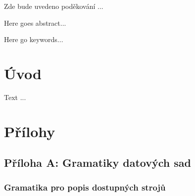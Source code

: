 \documentclass[draft]{fithesis}
\begin{document}
\FrontMatter
\ThesisTitlePage

\begin{ThesisDeclaration}
\DeclarationText
\AdvisorName
\end{ThesisDeclaration}

\begin{ThesisThanks}
Zde bude uvedeno poděkování ... 
\end{ThesisThanks}

\begin{ThesisAbstract}
Here goes abstract...
\end{ThesisAbstract}

\begin{ThesisKeyWords}
Here go keywords...
\end{ThesisKeyWords}

\MainMatter
\tableofcontents
\chapter*{Úvod}
Text ...
\chapter*{Přílohy}

\section*{Příloha A: Gramatiky datových sad}

\subsection*{Gramatika pro popis dostupných strojů}
\end{document}
